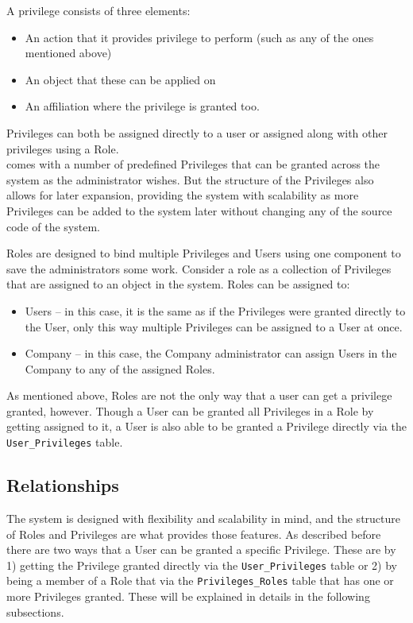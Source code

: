 A privilege consists of three elements:

\begin{itemize}
    \item An action that it provides privilege to perform (such as any of the ones mentioned above)
    \item An object that these can be applied on
    \item An affiliation where the privilege is granted too.
\end{itemize}

Privileges can both be assigned directly to a user or assigned along with other privileges using a Role. \\

\projectname{} comes with a number of predefined Privileges that can be granted across the system as the administrator wishes.
But the structure of the Privileges also allows for later expansion, providing the system with scalability as more Privileges can be added to the system later without changing any of the source code of the system.


Roles are designed to bind multiple Privileges and Users using one component to save the administrators some work.
Consider a role as a collection of Privileges that are assigned to an object in the system.
Roles can be assigned to:

\begin{itemize}
    \item Users -- in this case, it is the same as if the Privileges were granted directly to the User, only this way multiple Privileges can be assigned to a User at once.
    \item Company -- in this case, the Company administrator can assign Users in the Company to any of the assigned Roles.
\end{itemize}

As mentioned above, Roles are not the only way that a user can get a privilege granted, however.
Though a User can be granted all Privileges in a Role by getting assigned to it, a User is also able to be granted a Privilege directly via the \verb+User_Privileges+ table.


\subsection{Relationships}
The system is designed with flexibility and scalability in mind, and the structure of Roles and Privileges are what provides those features.
As described before there are two ways that a User can be granted a specific Privilege.
These are by 1) getting the Privilege granted directly via the \verb+User_Privileges+ table or 2) by being a member of a Role that via the \verb+Privileges_Roles+ table that has one or more Privileges granted.
These will be explained in details in the following subsections.


